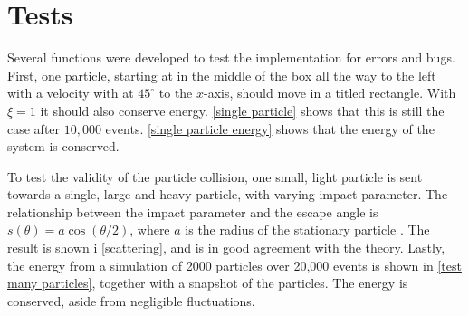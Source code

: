 \documentclass{article}
\begin{document}
    \section*{Tests}
    Several functions were developed to test the implementation for errors and bugs. First, one particle, starting at in the middle of the box all the way to the left with a velocity with at $45^\circ$ to the $x$-axis, should move in a titled rectangle. With $\xi=1$ it should also conserve energy. \autoref{single particle} shows that this is still the case after $10,000$ events. \autoref{single particle energy} shows that the energy of the system is conserved.
    
    To test the validity of the particle collision, one small, light particle is sent towards a single, large and heavy particle, with varying impact parameter. The relationship between the impact parameter and the escape angle is $s(\theta) = a \cos(\theta / 2)$, where $a$ is the radius of the stationary particle \cite{klasmek}. The result is shown i \autoref{scattering}, and is in good agreement with the theory. Lastly, the energy from a simulation of 2000 particles over 20,000 events is shown in \autoref{test many particles}, together with a snapshot of the particles. The energy is conserved, aside from negligible fluctuations.
\end{document}
